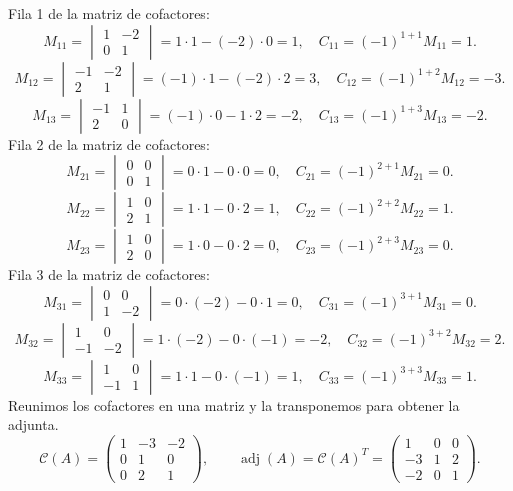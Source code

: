 \documentclass[12pt]{article}
\newcommand{\adj}{\operatorname{adj}}
\begin{document}
Fila 1 de la matriz de cofactores:
\[
M_{11}=\begin{vmatrix}1&-2\\0&1\end{vmatrix}=1\cdot 1-(-2)\cdot 0=1,\quad C_{11}=(-1)^{1+1}M_{11}=1.
\]
\[
M_{12}=\begin{vmatrix}-1&-2\\2&1\end{vmatrix}=(-1)\cdot 1-(-2)\cdot 2=3,\quad C_{12}=(-1)^{1+2}M_{12}=-3.
\]
\[
M_{13}=\begin{vmatrix}-1&1\\2&0\end{vmatrix}=(-1)\cdot 0-1\cdot 2=-2,\quad C_{13}=(-1)^{1+3}M_{13}=-2.
\]
Fila 2 de la matriz de cofactores:
\[
M_{21}=\begin{vmatrix}0&0\\0&1\end{vmatrix}=0\cdot 1-0\cdot 0=0,\quad C_{21}=(-1)^{2+1}M_{21}=0.
\]
\[
M_{22}=\begin{vmatrix}1&0\\2&1\end{vmatrix}=1\cdot 1-0\cdot 2=1,\quad C_{22}=(-1)^{2+2}M_{22}=1.
\]
\[
M_{23}=\begin{vmatrix}1&0\\2&0\end{vmatrix}=1\cdot 0-0\cdot 2=0,\quad C_{23}=(-1)^{2+3}M_{23}=0.
\]
Fila 3 de la matriz de cofactores:
\[
M_{31}=\begin{vmatrix}0&0\\1&-2\end{vmatrix}=0\cdot (-2)-0\cdot 1=0,\quad C_{31}=(-1)^{3+1}M_{31}=0.
\]
\[
M_{32}=\begin{vmatrix}1&0\\-1&-2\end{vmatrix}=1\cdot (-2)-0\cdot (-1)=-2,\quad C_{32}=(-1)^{3+2}M_{32}=2.
\]
\[
M_{33}=\begin{vmatrix}1&0\\-1&1\end{vmatrix}=1\cdot 1-0\cdot (-1)=1,\quad C_{33}=(-1)^{3+3}M_{33}=1.
\]
Reunimos los cofactores en una matriz y la transponemos para obtener la adjunta.
\[
\mathcal{C}(A)=\begin{pmatrix}1&-3&-2\\0&1&0\\0&2&1\end{pmatrix},\qquad\adj(A)=\mathcal{C}(A)^T=\begin{pmatrix}1&0&0\\-3&1&2\\-2&0&1\end{pmatrix}.
\]
\end{document}
